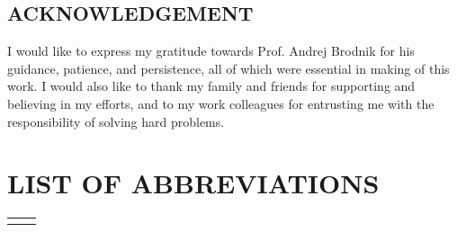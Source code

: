 \section*{ACKNOWLEDGEMENT}
I would like to express my gratitude towards Prof. Andrej Brodnik for his guidance, patience, and persistence, all of which were essential in making of this work.
I would also like to thank my family and friends for supporting and believing in my efforts, and to my work colleagues for entrusting me with the responsibility of solving hard problems.


\newpage

\tableofcontents
{}
\newpage
\listoftables
{}
\newpage
\listoffigures
{}
\newpage
\renewcommand{\cftdot}{}
\thispagestyle{fancy}
\newpage

\chapter*{LIST OF ABBREVIATIONS}
\thispagestyle{fancyplain}
\begin{longtable}{@{}p{1cm}@{}p{\dimexpr\textwidth-1cm\relax}@{}}
\nomenclature{$ZKP$}{Zero-Knowledge Proof}
\nomenclature{$EAP$}{Extensible Authentication Protocol}
\end{longtable}
\newpage

\normalsize




